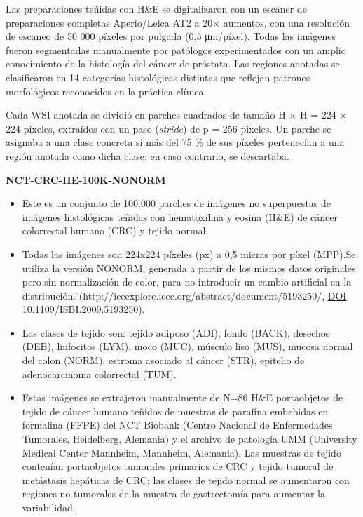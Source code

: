 Las preparaciones teñidas con H\&E se digitalizaron con un escáner de
preparaciones completas Aperio/Leica AT2 a 20× aumentos, con una
resolución de escaneo de 50 000 píxeles por pulgada (0,5 μm/píxel).
Todas las imágenes fueron segmentadas manualmente por patólogos
experimentados con un amplio conocimiento de la histología del cáncer de
próstata. Las regiones anotadas se clasificaron en 14 categorías
histológicas distintas que reflejan patrones morfológicos reconocidos en
la práctica clínica.

Cada WSI anotada se dividió en parches cuadrados de tamaño H × H = 224 ×
224 píxeles, extraídos con un paso (\emph{stride}) de p = 256 píxeles.
Un parche se asignaba a una clase concreta si más del 75 \% de sus
píxeles pertenecían a una región anotada como dicha clase; en caso
contrario, se descartaba.

\textbf{NCT-CRC-HE-100K-NONORM}

\begin{itemize}
\item
  Este es un conjunto de 100.000 parches de imágenes no superpuestas de
  imágenes histológicas teñidas con hematoxilina y eosina (H\&E) de
  cáncer colorrectal humano (CRC) y tejido normal.
\item
  Todas las imágenes son 224x224 píxeles (px) a 0,5 micras por píxel
  (MPP).Se utiliza la versión NONORM, generada a partir de los mismos
  datos originales pero sin normalización de color, para no introducir
  un cambio artificial en la
  distribución.''(http://ieeexplore.ieee.org/abstract/document/5193250/,
  \href{https://doi.org/10.1109/ISBI.2009.5193250}{\ul{DOI
  10.1109/ISBI.2009.}}5193250).
\item
  Las clases de tejido son: tejido adiposo (ADI), fondo (BACK), desechos
  (DEB), linfocitos (LYM), moco (MUC), músculo liso (MUS), mucosa normal
  del colon (NORM), estroma asociado al cáncer (STR), epitelio de
  adenocarcinoma colorrectal (TUM).
\item
  Estas imágenes se extrajeron manualmente de N=86 H\&E portaobjetos de
  tejido de cáncer humano teñidos de muestras de parafina embebidas en
  formalina (FFPE) del NCT Biobank (Centro Nacional de Enfermedades
  Tumorales, Heidelberg, Alemania) y el archivo de patología UMM
  (University Medical Center Mannheim, Mannheim, Alemania). Las muestras
  de tejido contenían portaobjetos tumorales primarios de CRC y tejido
  tumoral de metástasis hepáticas de CRC; las clases de tejido normal se
  aumentaron con regiones no tumorales de la muestra de gastrectomía
  para aumentar la variabilidad.
\end{itemize}

